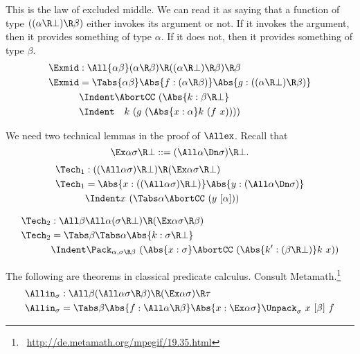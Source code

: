 \documentclass{amsart}
\begin{document}
This is the law of excluded middle. We can read it as saying that
a function of type $((\alpha\R\bot) \R \beta)$ either invokes its
argument or not. If it invokes the argument, then it provides
something of type $\alpha$. If it does not, then it provides
something of type $\beta$.
\begin{align*}
\Exmid & : \All{\alpha\beta}
  (\alpha \R \beta) \R
  ((\alpha\R\bot)\R\beta) \R
  \beta
\\
\Exmid & = \Tabs{\alpha\beta}
\Abs{f:(\alpha \R \beta)}
\Abs{g:((\alpha\R\bot)\R\beta)}
\\&\Indent
\AbortCC~(\Abs{k:\beta\R\bot}
\\&\Indent\hspace{1em}
k~(g~(\Abs{x:\alpha}
k~(f~x))))
\end{align*}

We need two technical lemmas in the proof of $\Allex$. Recall
that
\[
\Ex\alpha\sigma\R\bot ::= (\All\alpha\Dn\sigma)\R\bot.
\]
\begin{align*}
\Tech_1 & : ((\All\alpha\sigma)\R\bot) \R (\Ex\alpha\sigma\R\bot)
\\
\Tech_1 & =
\Abs{x : ((\All\alpha\sigma) \R \bot)}
\Abs{y : (\All\alpha \Dn\sigma)}
\\&\Indent
x~(\Tabs\alpha \AbortCC~(y~[\alpha]))
\end{align*}

\begin{align*}
\Tech_2 & : \All\beta \All\alpha
  (\sigma\R\bot) \R (\Ex\alpha \sigma\R\beta)
\\
\Tech_2 & = \Tabs\beta \Tabs\alpha \Abs{k : \sigma\R\bot}
\\&\Indent
\Pack_{\alpha,\sigma\R\beta}~(\Abs{x:\sigma}
\AbortCC~(\Abs{k' : (\beta\R\bot)} k~x))
\end{align*}

The following are theorems in classical predicate calculus.
Consult Metamath.\footnote{
~\url{http://de.metamath.org/mpegif/19.35.html}
}
\begin{align*}
\Allin_\sigma & : \All\beta
  (\All\alpha \sigma\R\beta) \R
  (\Ex\alpha \sigma) \R \tau
  \\
\Allin_\sigma & = \Tabs\beta
\Abs{f : \All\alpha \R \beta}
\Abs{x : \Ex\alpha \sigma}
\Unpack_\sigma~x~[\beta]~f
\end{align*}
\end{document}
